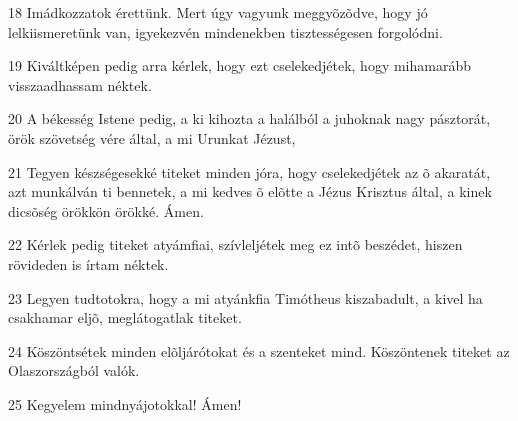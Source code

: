\par 18 Imádkozzatok érettünk. Mert úgy vagyunk meggyõzõdve, hogy jó lelkiismeretünk van, igyekezvén mindenekben tisztességesen forgolódni.
\par 19 Kiváltképen pedig arra kérlek, hogy ezt cselekedjétek, hogy mihamarább visszaadhassam néktek.
\par 20 A békesség Istene pedig, a ki kihozta a halálból a juhoknak nagy pásztorát, örök szövetség vére által, a mi Urunkat Jézust,
\par 21 Tegyen készségesekké titeket minden jóra, hogy cselekedjétek az õ akaratát, azt munkálván ti bennetek, a mi kedves õ elõtte a Jézus Krisztus által, a kinek dicsõség örökkön örökké. Ámen.
\par 22 Kérlek pedig titeket atyámfiai, szívleljétek meg ez intõ beszédet, hiszen rövideden is írtam néktek.
\par 23 Legyen tudtotokra, hogy a mi atyánkfia Timótheus kiszabadult, a kivel ha csakhamar eljõ, meglátogatlak titeket.
\par 24 Köszöntsétek minden elõljárótokat és a szenteket mind. Köszöntenek titeket az Olaszországból valók.
\par 25 Kegyelem mindnyájotokkal! Ámen!



